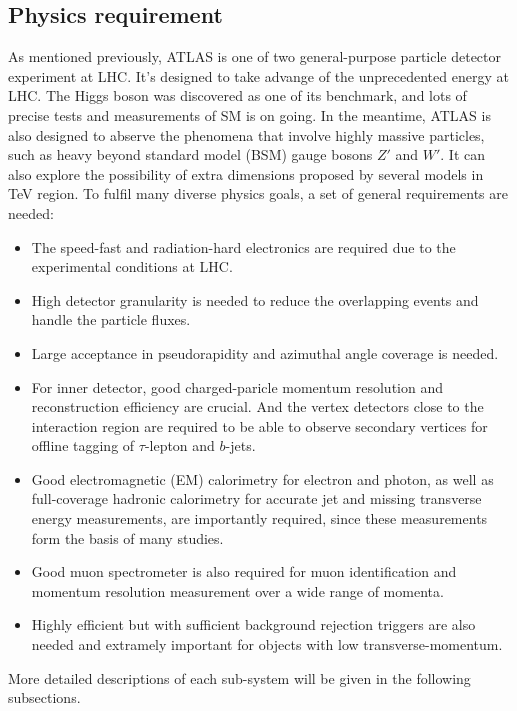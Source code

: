 \subsection{Physics requirement}

As mentioned previously, ATLAS is one of two general-purpose particle detector experiment at LHC.
It's designed to take advange of the unprecedented energy at LHC.
The Higgs boson was discovered as one of its benchmark, and lots of precise tests and measurements of SM is on going.
In the meantime, ATLAS is also designed to abserve the phenomena that involve highly massive particles, such as heavy beyond standard model (BSM) gauge bosons $Z'$ and $W'$.
It can also explore the possibility of extra dimensions proposed by several models in TeV region.
To fulfil many diverse physics goals, a set of general requirements are needed:
\begin{itemize}
	\item The speed-fast and radiation-hard electronics are required due to the experimental conditions at LHC. 
	\item High detector granularity is needed to reduce the overlapping events and handle the particle fluxes.
	\item Large acceptance in pseudorapidity and azimuthal angle coverage is needed.
	\item For inner detector, good charged-paricle momentum resolution and reconstruction efficiency are crucial. And the vertex detectors close to the interaction region are required to be able to observe secondary vertices for offline tagging of $\tau$-lepton and $b$-jets.
	\item Good electromagnetic (EM) calorimetry for electron and photon, as well as full-coverage hadronic calorimetry for accurate jet and missing transverse energy measurements, are importantly required, since these measurements form the basis of many studies.
	\item Good muon spectrometer is also required for muon identification and momentum resolution measurement over a wide range of momenta.
	\item Highly efficient but with sufficient background rejection triggers are also needed and extramely important for objects with low transverse-momentum. 
\end{itemize}

More detailed descriptions of each sub-system will be given in the following subsections.
